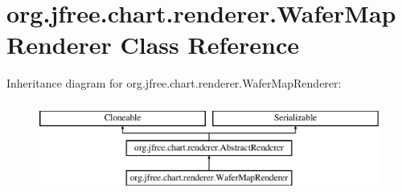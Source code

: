\hypertarget{classorg_1_1jfree_1_1chart_1_1renderer_1_1_wafer_map_renderer}{}\section{org.\+jfree.\+chart.\+renderer.\+Wafer\+Map\+Renderer Class Reference}
\label{classorg_1_1jfree_1_1chart_1_1renderer_1_1_wafer_map_renderer}
Inheritance diagram for org.\+jfree.\+chart.\+renderer.\+Wafer\+Map\+Renderer\+:\begin{figure}[H]
\begin{center}
\leavevmode
\includegraphics[height=3.000000cm]{classorg_1_1jfree_1_1chart_1_1renderer_1_1_wafer_map_renderer}
\end{center}
\end{figure}
